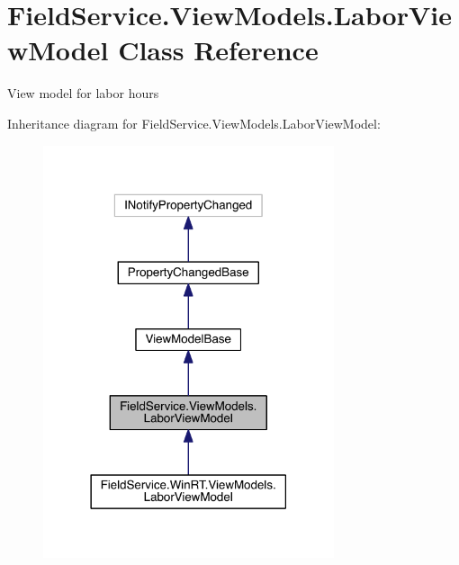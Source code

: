 \hypertarget{class_field_service_1_1_view_models_1_1_labor_view_model}{\section{Field\+Service.\+View\+Models.\+Labor\+View\+Model Class Reference}
\label{class_field_service_1_1_view_models_1_1_labor_view_model}
}


View model for labor hours  




Inheritance diagram for Field\+Service.\+View\+Models.\+Labor\+View\+Model\+:
\nopagebreak
\begin{figure}[H]
\begin{center}
\leavevmode
\includegraphics[width=242pt]{class_field_service_1_1_view_models_1_1_labor_view_model__inherit__graph}
\end{center}
\end{figure}


